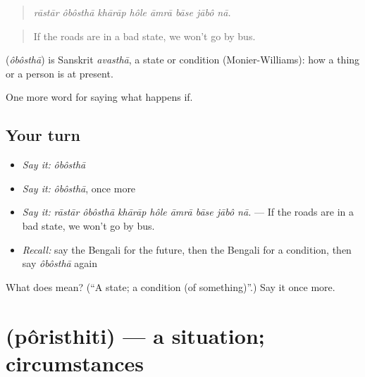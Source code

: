 \begin{quote}
       
\end{quote}

\begin{quote}
\emph{rāstār ôbôsthā khārāp hôle āmrā bāse jābô nā.}
\end{quote}

\begin{quote}
If the roads are in a bad state, we won't go by bus.
\end{quote}

\begin{cousinweb}
\textbf{} (\emph{ôbôsthā}) is Sanskrit \emph{avasthā}, a state or condition (Monier-Williams): how a thing or a person is at present.
\end{cousinweb}

\begin{grammarlens}[title={What you've built}]
One more word for saying what happens if.
\end{grammarlens}

\subsection*{Your turn}
\begin{itemize}
\raggedright
  \item \emph{Say it:} \emph{ôbôsthā}
  \item \emph{Say it:} \emph{ôbôsthā}, once more
  \item \emph{Say it:} \emph{rāstār ôbôsthā khārāp hôle āmrā bāse jābô nā.} — If the roads are in a bad state, we won't go by bus.
  \item \emph{Recall:} say the Bengali for the future, then the Bengali for a condition, then say \emph{ôbôsthā} again
\end{itemize}

\begin{tcolorbox}[breakable,colback=teal!4,colframe=teal!35!black,title={Before you move on}]
What does  mean? (\textquotedblleft{}A state; a condition (of something)\textquotedblright{}.) Say it once more.
\end{tcolorbox}
\section[\texorpdfstring{\bn{পরিস্থিতি} (pôristhiti)}{পরিস্থিতি (pôristhiti)}]{ (pôristhiti) — a situation; circumstances}

